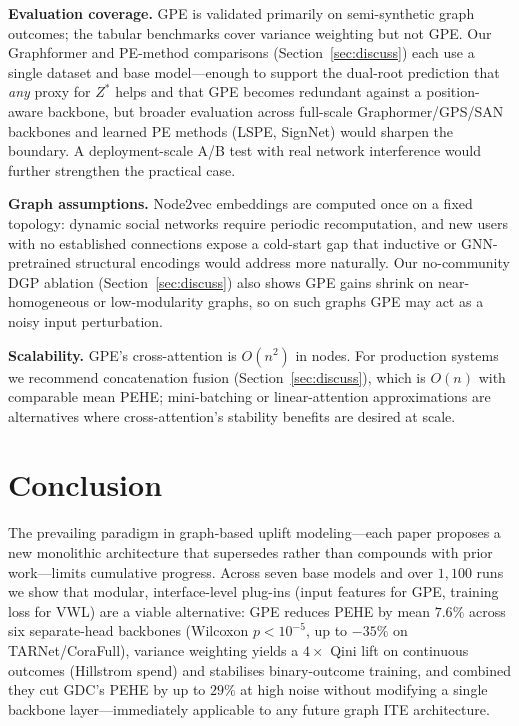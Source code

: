 \documentclass[sigconf,anonymous,review]{acmart}
\begin{document}
\textbf{Evaluation coverage.} GPE is validated primarily on semi-synthetic graph outcomes; the tabular benchmarks cover variance weighting but not GPE. Our Graphformer and PE-method comparisons (Section~\ref{sec:discuss}) each use a single dataset and base model---enough to support the dual-root prediction that \emph{any} proxy for $Z^*$ helps and that GPE becomes redundant against a position-aware backbone, but broader evaluation across full-scale Graphormer/GPS/SAN backbones and learned PE methods (LSPE, SignNet) would sharpen the boundary.  A deployment-scale A/B test with real network interference would further strengthen the practical case.

\textbf{Graph assumptions.} Node2vec embeddings are computed once on a fixed topology: dynamic social networks require periodic recomputation, and new users with no established connections expose a cold-start gap that inductive or GNN-pretrained structural encodings would address more naturally. Our no-community DGP ablation (Section~\ref{sec:discuss}) also shows GPE gains shrink on near-homogeneous or low-modularity graphs, so on such graphs GPE may act as a noisy input perturbation.

\textbf{Scalability.} GPE's cross-attention is $O(n^2)$ in nodes. For production systems we recommend concatenation fusion (Section~\ref{sec:discuss}), which is $O(n)$ with comparable mean PEHE; mini-batching or linear-attention approximations are alternatives where cross-attention's stability benefits are desired at scale.

\section{Conclusion}\label{sec:conclusion}

The prevailing paradigm in graph-based uplift modeling---each paper proposes a new monolithic architecture that supersedes rather than compounds with prior work---limits cumulative progress. Across seven base models and over $1{,}100$ runs we show that modular, interface-level plug-ins (input features for GPE, training loss for VWL) are a viable alternative: GPE reduces PEHE by mean $7.6\%$ across six separate-head backbones (Wilcoxon $p<10^{-5}$, up to $-35\%$ on TARNet/CoraFull), variance weighting yields a $4{\times}$ Qini lift on continuous outcomes (Hillstrom spend) and stabilises binary-outcome training, and combined they cut GDC's PEHE by up to $29\%$ at high noise without modifying a single backbone layer---immediately applicable to any future graph ITE architecture.



\end{document}
